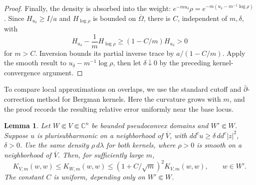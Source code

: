 \documentclass[reqno]{amsart}
\numberwithin{equation}{section}
\newtheorem{lemma}[theorem]{Lemma}
\theoremstyle{definition}
\begin{document}
\begin{proof}
Finally, the density is absorbed into the weight:
$e^{-mu_\delta}\rho=e^{-m(u_\delta-m^{-1}\log\rho)}$.
Since $H_{u_\delta}\ge I/a$ and $H_{\log\rho}$ is bounded on
$\overline\Omega$, there is $C$, independent of $m,\delta$, with
\[
H_{u_\delta}-\frac1mH_{\log\rho}
\ge(1-C/m)H_{u_\delta}>0
\]
for $m>C$.
Inversion bounds its partial inverse trace by $a/(1-C/m)$.
Apply the smooth result to $u_\delta-m^{-1}\log\rho$, then let
$\delta\downarrow0$ by the preceding kernel-convergence argument.
\end{proof}


To compare local approximations on overlaps, we use the standard
cutoff and $\bar\partial$-correction method for Bergman kernels.
Here the curvature grows with $m$, and the proof records
the resulting relative error uniformly near the base locus.
\begin{lemma}\label{lem:localization}
Let $W\Subset V\Subset\mathbb C^n$ be bounded pseudoconvex domains and $W'\Subset W$. Suppose $u$ is plurisubharmonic on a neighborhood of $\overline V$, with $dd^cu\ge\delta\,dd^c|z|^2$, $\delta>0$. Use the same density $\rho\,d\lambda$ for both kernels, where
$\rho>0$ is smooth on a neighborhood of $\overline V$. Then, for sufficiently large $m$,
\begin{equation}\label{eq:kernel-comparison}
K_{V,m}(w,w)\le K_{W,m}(w,w)
 \le(1+C/\sqrt m)^2K_{V,m}(w,w),\qquad w\in W'.
\end{equation}
The constant $C$ is uniform,  depending only on $W'\Subset W$.
\end{lemma}
\end{document}
